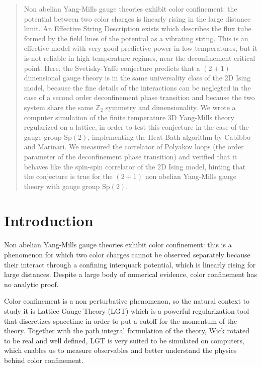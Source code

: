 \documentclass[reqno,12pt]{article}
\numberwithin{equation}{section}
\newcommand{\Sp}{\mathrm{Sp}}
\begin{document}
\begin{abstract}
	Non abelian Yang-Mills gauge theories exhibit color confinement: the potential between two color charges is linearly
	rising in the large distance limit. An Effective String Description exists which describes the flux tube formed by
	the field lines of the potential as a vibrating string. This is an effective model with very good predictive power in
	low temperatures, but it is not reliable in high temperature regimes, near the deconfinement critical point. Here,
	the Svetisky-Yaffe conjecture predicts that a $(2+1)$ dimensional gauge theory is in the same universality class
	of the 2D Ising model, because the fine details of the interactions can be neglegted in the case of a second order
	deconfinement phase transition and because the two system share the same $\mathbb{Z}_2$ symmetry and dimensionality. 
	We wrote a computer simulation of the finite temperature 3D Yang-Mills theory regularized on a lattice,
	in order to test this conjecture in the case
	of the gauge group $\Sp(2)$, implementing the Heat-Bath algorithm by Cabibbo and Marinari. We measured the correlator
	of Polyakov loops (the order parameter of the deconfinement phase transition) and verified that it behaves like the
	spin-spin correlator of the 2D Ising model, hinting that the conjecture is true for the $(2+1)$ non abelian Yang-Mills
	gauge theory with gauge group $\Sp(2)$.
\end{abstract}

\newpage

\tableofcontents

\newpage

\section{Introduction}

Non abelian Yang-Mills gauge theories exhibit color confinement: this is a phenomenon for which two color charges cannot be
observed separately because their interact through a confining interquark potential, which is linearly rising for
large distances. Despite a large body of numerical evidence, color confinement has no analytic proof.

Color confinement is a non perturbative phenomenon, so the natural context to study it is Lattice Gauge Theory (LGT) which is
a powerful regularization tool that discretizes spacetime in order to put a cutoff for the momentum of the theory. Together with
the path integral formulation of the theory, Wick rotated to be real and well defined, LGT is very suited to be simulated
on computers, which enables us to measure observables and better understand the physics behind color confinement. 
\end{document}
